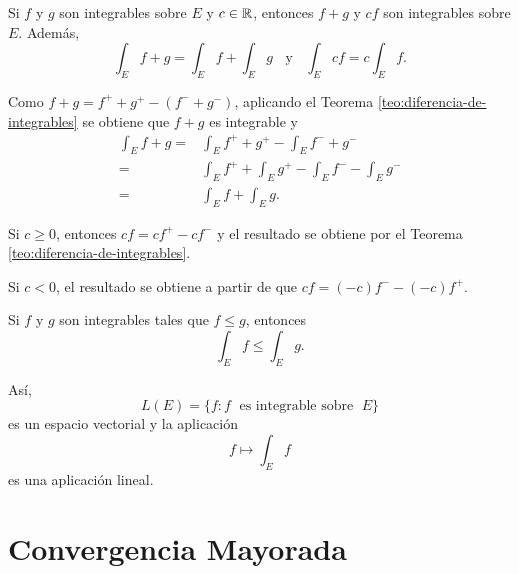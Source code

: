                    \begin{teorema}{}
                   Si $f$ y $g$ son integrables sobre $E$ y $c\in \mathbb{R}$, entonces $f+g$ y $cf$ son integrables sobre $E$. Adem\'as, 
                   \[
                   \int_E f+g =\int_E f +\int_E g
                   \;\;\mbox{ y }\;\;
                   \int_E cf =c\int_E f.
                   \]
                 \end{teorema}
                    
                    \begin{demo}
                     Como $f+g=f^+ + g^+ -(f^-+g^-)$, aplicando el Teorema \ref{teo:diferencia-de-integrables} se obtiene que $f+g$ es integrable y         \[
                     \begin{split}
                     \int_E f+g =&\int_E f^{+} +g^{+}  - \int_E f^{-} + g^{-}
                     \\
                     =&\int_E f^{+} +\int_E g^{+}  - \int_E f^{-} -\int_E g^{-}
                     \\
                     =&\int_E f + \int_E g.
                     \end{split}
                     \]
                     
                     Si $c\geq 0$, entonces $cf=cf^{+}-cf^{-}$ y el resultado se obtiene por el Teorema \ref{teo:diferencia-de-integrables}.
                     
                     Si $c<0$, el resultado se obtiene a partir de que $cf=(-c)f^{-}-(-c)f^{+}$.
                    \end{demo}
                    
                    \begin{corolario}{}
                    Si $f$ y $g$ son integrables tales que $f\leq g$, entonces 
                    \[\int_E f \leq \int_E g.\]
                    \end{corolario}
                    
                    
                    As\'i, 
                    \[
                    L(E)=\{
                    f: f\;\mbox{ es integrable sobre }\;E
                    \}
                    \]
                    es un espacio vectorial y la aplicaci\'on
                    \[
                    f \longmapsto \int_E f
                    \]
                    es una aplicaci\'on lineal.
                    
                    \section{Convergencia Mayorada}
                    
